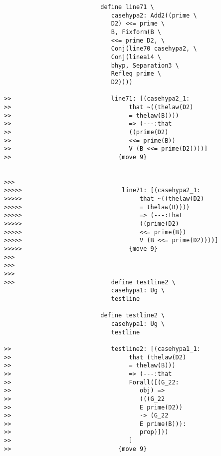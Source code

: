 \documentclass[12pt]{article}
\begin{document}
\begin{verbatim}
                           define line71 \
                              casehypa2: Add2((prime \
                              D2) <<= prime \
                              B, Fixform(B \
                              <<= prime D2, \
                              Conj(line70 casehypa2, \
                              Conj(linea14 \
                              bhyp, Separation3 \
                              Refleq prime \
                              D2))))

>>                            line71: [(casehypa2_1:
>>                                 that ~((thelaw(D2)
>>                                 = thelaw(B))))
>>                                 => (---:that
>>                                 ((prime(D2)
>>                                 <<= prime(B))
>>                                 V (B <<= prime(D2))))]
>>                              {move 9}


>>>
>>>>>                            line71: [(casehypa2_1:
>>>>>                                 that ~((thelaw(D2)
>>>>>                                 = thelaw(B))))
>>>>>                                 => (---:that
>>>>>                                 ((prime(D2)
>>>>>                                 <<= prime(B))
>>>>>                                 V (B <<= prime(D2))))]
>>>>>                              {move 9}
>>>
>>>
>>>
>>>                           define testline2 \
                              casehypa1: Ug \
                              testline

                           define testline2 \
                              casehypa1: Ug \
                              testline

>>                            testline2: [(casehypa1_1:
>>                                 that (thelaw(D2)
>>                                 = thelaw(B)))
>>                                 => (---:that
>>                                 Forall([(G_22:
>>                                    obj) =>
>>                                    (((G_22
>>                                    E prime(D2))
>>                                    -> (G_22
>>                                    E prime(B))):
>>                                    prop)]))
>>                                 ]
>>                              {move 9}



\end{verbatim}
\end{document}
